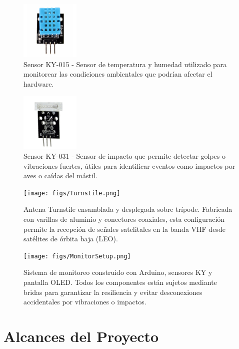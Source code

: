 \documentclass[conference]{IEEEtran}
\begin{document}
\begin{figure}[H]
    \centering
    \includegraphics[width=0.25\textwidth]{figs/KY015.png}
    \caption{Sensor KY-015 - Sensor de temperatura y humedad utilizado para monitorear las condiciones ambientales que podrían afectar el hardware.}
    \label{fig:ky015}
\end{figure}

\begin{figure}[H]
    \centering
    \includegraphics[width=0.25\textwidth]{figs/KY031.png}
    \caption{Sensor KY-031 - Sensor de impacto que permite detectar golpes o vibraciones fuertes, útiles para identificar eventos como impactos por aves o caídas del mástil.}
    \label{fig:ky031}
\end{figure}

\begin{figure}[H]
    \centering
    \texttt{[image: figs/Turnstile.png]}
    \caption{Antena Turnstile ensamblada y desplegada sobre trípode. Fabricada con varillas de aluminio y conectores coaxiales, esta configuración permite la recepción de señales satelitales en la banda VHF desde satélites de órbita baja (LEO).}
    \label{fig:antena_turnstile}
\end{figure}

\begin{figure}[H]
  \centering
  \texttt{[image: figs/MonitorSetup.png]}
  \caption{Sistema de monitoreo construido con Arduino, sensores KY y pantalla OLED. Todos los componentes están sujetos mediante bridas para garantizar la resiliencia y evitar desconexiones accidentales por vibraciones o impactos.}
  \label{fig:componentes_monitoreo}
\end{figure}

\section{Alcances del Proyecto}
\end{document}
